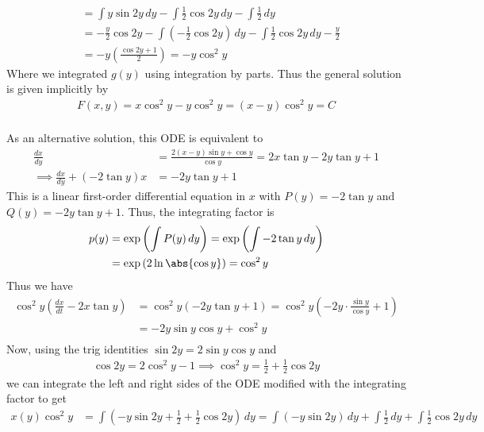 \documentclass{article}
\begin{document}
\begin{enumerate}
\begin{soln}
\begin{align*}
				&= \int y\sin 2y\, dy - \int \frac{1}{2}\cos 2y\, dy - \int \frac{1}{2}\, dy \\
				&= -\frac{y}{2}\cos 2y - \int \left( -\frac{1}{2}\cos 2y \right)\, dy - \int \frac{1}{2}\cos 2y\, dy - \frac{y}{2} \\
				&= -y\left( \frac{\cos 2y + 1}{2} \right) = -y\cos^2 y
			\end{align*}
			Where we integrated $g(y)$ using integration by parts. Thus the general solution is given implicitly by
			\begin{align*}
				F(x, y) = x\cos^2y -y\cos^2y = \boxed{(x-y)\cos^2y = C} \\
			\end{align*}

			As an alternative solution, this ODE is equivalent to
			\begin{align*}
				\frac{dx}{dy} &= \frac{2(x-y)\sin y + \cos y}{\cos y} = 2x\tan y - 2y\tan y + 1 \\
				\implies \frac{dx}{dy} + (-2\tan y) x &= -2y\tan y + 1
			\end{align*}
			This is a linear first-order differential equation in $x$ with $P(y)=-2\tan y$ and $Q(y) = -2y\tan y + 1.$ Thus, the integrating factor is
			\begin{align*}
				p(y) &= \exp\left( \int P(y)\, dy \right) = \exp\left( \int -2\tan y\, dy \right) \\ 
				&= \exp\left( 2\ln\abs{\cos y} \right)= \cos^2 y
			\end{align*}
			Thus we have
			\begin{align*}
				\cos^2 y \left( \frac{dx}{dt} -2x\tan y \right) &= \cos^2y \left( -2y\tan y+ 1 \right) = \cos^2y \left( -2y\cdot \frac{\sin y}{\cos y} + 1 \right) \\
				&= -2y\sin y\cos y + \cos^2y \\
			\end{align*}
			Now, using the trig identities $\sin 2y = 2\sin y\cos y$ and
			\begin{align*}
				\cos 2y = 2\cos^2y - 1 \implies \cos^2y = \frac{1}{2} + \frac{1}{2}\cos 2y
			\end{align*}
			we can integrate the left and right sides of the ODE modified with the integrating factor to get
			\begin{align*}
				x(y) \cos^2y &= \int\left( -y\sin 2y + \frac{1}{2} + \frac{1}{2}\cos 2y \right)\, dy = \int\left( -y\sin 2y \right)\, dy + \int \frac{1}{2}\, dy + \int \frac{1}{2}\cos 2y\, dy
			\end{align*}

\end{soln}
\end{enumerate}
\end{document}
